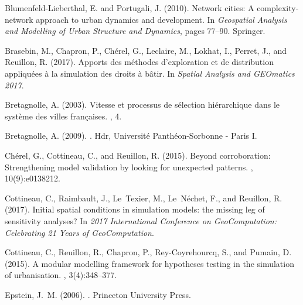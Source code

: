 \documentclass[graybox]{svmult}
\begin{document}
\begin{thebibliography}{}
Blumenfeld-Lieberthal, E. and Portugali, J. (2010).
\newblock Network cities: A complexity-network approach to urban dynamics and
  development.
\newblock In {\em Geospatial Analysis and Modelling of Urban Structure and
  Dynamics}, pages 77--90. Springer.

Brasebin, M., Chapron, P., Ch{\'e}rel, G., Leclaire, M., Lokhat, I., Perret,
  J., and Reuillon, R. (2017).
\newblock Apports des m{\'e}thodes d'exploration et de distribution
  appliqu{\'e}es {\`a} la simulation des droits {\`a} b{\^a}tir.
\newblock In {\em Spatial Analysis and GEOmatics 2017}.

Bretagnolle, A. (2003).
\newblock Vitesse et processus de s{\'e}lection hi{\'e}rarchique dans le
  syst{\`e}me des villes fran{\c{c}}aises.
, 4.

Bretagnolle, A. (2009).
.
\newblock Hdr, Universit{\'e} Panth{\'e}on-Sorbonne - Paris I.

Ch{\'e}rel, G., Cottineau, C., and Reuillon, R. (2015).
\newblock Beyond corroboration: Strengthening model validation by looking for
  unexpected patterns.
, 10(9):e0138212.

Cottineau, C., Raimbault, J., Le~Texier, M., Le~N{\'e}chet, F., and Reuillon,
  R. (2017).
\newblock Initial spatial conditions in simulation models: the missing leg of
  sensitivity analyses?
\newblock In {\em 2017 International Conference on GeoComputation: Celebrating
  21 Years of GeoComputation}.

Cottineau, C., Reuillon, R., Chapron, P., Rey-Coyrehourcq, S., and Pumain, D.
  (2015).
\newblock A modular modelling framework for hypotheses testing in the
  simulation of urbanisation.
, 3(4):348--377.

Epstein, J.~M. (2006).
.
\newblock Princeton University Press.


\end{thebibliography}
\end{document}
